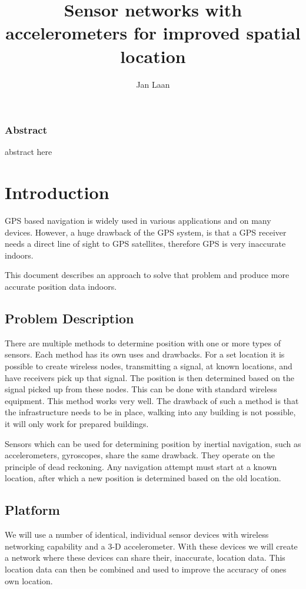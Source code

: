 \documentclass[twoside, 11pt]{uva-bachelor-thesis}
\author{Jan Laan}
\title{Sensor networks with accelerometers for improved spatial location}
\begin{document}
\maketitle

\subsection*{Abstract}
abstract here
\newpage

\tableofcontents

\chapter{Introduction}
GPS based navigation is widely used in various applications and on many devices. However, a huge drawback of the GPS system, is that a GPS receiver needs a direct line of sight to GPS satellites, therefore GPS is very inaccurate indoors. 

This document describes an approach to solve that problem and produce more accurate position data indoors.

\section{Problem Description}
There are multiple methods to determine position with one or more types of sensors. Each method has its own uses and drawbacks. For a set location it is possible to create wireless nodes, transmitting a signal, at known locations, and have receivers pick up that signal. The position is then determined based on the signal picked up from these nodes. \cite{stuvel} This can be done with standard wireless equipment. This method works very well. The drawback of such a method is that the infrastructure needs to be in place, walking into any building is not possible, it will only work for prepared buildings.

Sensors which can be used for determining position by inertial navigation, such as accelerometers, gyroscopes, share the same drawback. They operate on the principle of dead reckoning. Any navigation attempt must start at a known location, after which a new position is determined based on the old location.

\section{Platform}
We will use a number of identical, individual sensor devices with wireless networking capability and a 3-D accelerometer. With these devices we will create a network where these devices can share their, inaccurate, location data. This location data can then be combined  and used to improve the accuracy of ones own location.
\end{document}
